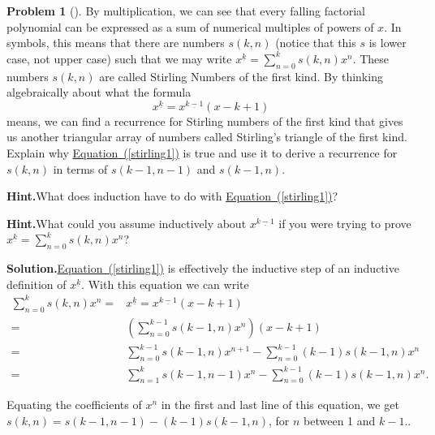 \documentclass[10pt,]{book}
\theoremstyle{plain}
\theoremstyle{definition}
\newtheorem{activity}[project]{Problem}
\theoremstyle{definition}
\numberwithin{equation}{chapter}
\newcommand{\amp}{&}
\begin{document}
\begin{activity}[]\label{Stirlingfirst}
By multiplication, we can see that every falling factorial polynomial can be expressed as a sum of numerical multiples of powers of \(x\). In symbols, this means that there are numbers \(s(k,n)\) (notice that this \(s\) is lower case, not upper case) such that we may write \(x^{\underline{k}} =
\sum_{n=0}^k s(k,n)x^n\). These numbers \(s(k,n)\) are called Stirling Numbers of the first kind. By thinking algebraically about what the formula%
\begin{equation}
x^{\underline{k}} =
x^{\underline{k-1}}(x-k+1)\label{stirling1}
\end{equation}
means, we can find a recurrence for Stirling numbers of the first kind that gives us another triangular array of numbers called Stirling's triangle of the first kind. Explain why \hyperref[stirling1]{Equation~(\ref{stirling1})} is true and use it to derive a recurrence for \(s(k,n)\) in terms of \(s(k-1,n-1)\) and \(s(k-1,n)\).%
\par\medskip\noindent%
\textbf{Hint.}\quad What does induction have to do with \hyperref[stirling1]{Equation~(\ref{stirling1})}?%
\par\medskip\noindent%
\textbf{Hint.}\quad What could you assume inductively about \(x^{\underline{k-1}}\) if you were trying to prove \(x^{\underline{k}} = \sum_{n=0}^k s(k,n)x^n\)?%
\par\medskip\noindent%
\textbf{Solution.}\quad \hyperref[stirling1]{Equation~(\ref{stirling1})} is effectively the inductive step of an inductive definition of \(x^{\underline{k}}\). With this equation we can write%
\begin{align*}
\sum_{n=0}^k s(k,n)x^n =\amp x^{\underline{k}} =
x^{\underline{k-1}}(x-k+1)\\
=\amp \left(\sum_{n=0}^{k-1}s(k-1,n)x^n\right)(x-k+1)\\
=\amp \sum_{n=0}^{k-1}s(k-1,n)x^{n+1} - \sum_{n=0}^{k-1}(k-1)s(k-1,n)x^n\\
=\amp \sum_{n=1}^k s(k-1,n-1)x^n-\sum_{n=0}^{k-1}(k-1)s(k-1,n)x^n.
\end{align*}
%
\par
Equating the coefficients of \(x^n\) in the first and last line of this equation, we get \(s(k,n) = s(k-1,n-1) -(k-1)s(k-1,n)\), for \(n\) between 1 and \(k-1\)..%
\end{activity}
\end{document}

